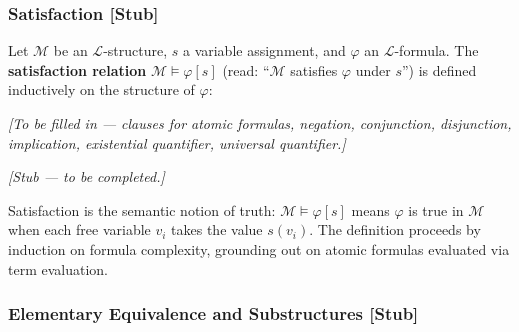 
\subsubsection*{Satisfaction \textnormal{[Stub]}}

\begin{tcolorbox}[colback=propbox, colframe=propborder, arc=2pt,
  left=6pt, right=6pt, top=4pt, bottom=4pt,
  title={\small\textbf{Definition (Satisfaction, $\mathcal{M} \models \varphi[s]$) — Stub}},
  fonttitle=\small\bfseries]
\label{def:satisfaction}
Let $\mathcal{M}$ be an $\mathcal{L}$-structure, $s$ a variable assignment,
and $\varphi$ an $\mathcal{L}$-formula.
The \textbf{satisfaction relation} $\mathcal{M} \models \varphi[s]$
(read: ``$\mathcal{M}$ satisfies $\varphi$ under $s$'') is defined
inductively on the structure of $\varphi$:

\medskip
\textit{[To be filled in — clauses for atomic formulas, negation,
conjunction, disjunction, implication, existential quantifier,
universal quantifier.]}
\end{tcolorbox}

\begin{remark*}
\textit{[Stub — to be completed.]}
\end{remark*}

\begin{remark*}[Intuition]
Satisfaction is the semantic notion of truth: $\mathcal{M} \models \varphi[s]$
means $\varphi$ is true in $\mathcal{M}$ when each free variable $v_i$ takes
the value $s(v_i)$.
The definition proceeds by induction on formula complexity,
grounding out on atomic formulas evaluated via term evaluation.
\end{remark*}


\subsubsection*{Elementary Equivalence and Substructures \textnormal{[Stub]}}
